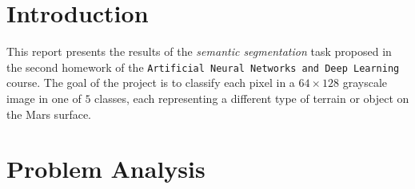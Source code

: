 \documentclass[11pt]{article}
\begin{document}
\begin{multicols}{2}

      \section{Introduction}


      This report presents the results of the \textit{semantic segmentation}\cite{long2015fullyconvolutionalnetworkssemantic}
      task proposed in the second homework of the \texttt{Artificial Neural Networks and Deep Learning} course. The goal of the project is to classify each pixel in a $64\times128$ grayscale image in one of $5$ classes, each representing a different type of terrain or object on the Mars surface.

      \section{Problem Analysis}
      \label{sec:analysis}


\end{multicols}
\end{document}
